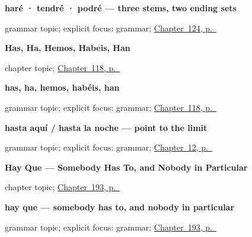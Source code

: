 \noindent\begin{minipage}[t]{\linewidth}
\raggedright
\textbf{haré · tendré · podré — three stems, two ending sets}\par
\footnotesize grammar topic; explicit focus: grammar; \hyperref[ch:spanish-future-conditional-stems]{Chapter~124, p.~\pageref*{ch:spanish-future-conditional-stems}}
\end{minipage}\par\smallskip

\noindent\begin{minipage}[t]{\linewidth}
\raggedright
\textbf{Has, Ha, Hemos, Habeis, Han}\par
\footnotesize chapter topic; \hyperref[ch:perfect-complete]{Chapter~118, p.~\pageref*{ch:perfect-complete}}
\end{minipage}\par\smallskip

\noindent\begin{minipage}[t]{\linewidth}
\raggedright
\textbf{has, ha, hemos, habéis, han}\par
\footnotesize grammar topic; explicit focus: grammar; \hyperref[ch:perfect-complete]{Chapter~118, p.~\pageref*{ch:perfect-complete}}
\end{minipage}\par\smallskip

\noindent\begin{minipage}[t]{\linewidth}
\raggedright
\textbf{hasta aquí / hasta la noche — point to the limit}\par
\footnotesize grammar topic; explicit focus: grammar; \hyperref[ch:goodbye]{Chapter~12, p.~\pageref*{ch:goodbye}}
\end{minipage}\par\smallskip

\noindent\begin{minipage}[t]{\linewidth}
\raggedright
\textbf{Hay Que --- Somebody Has To, and Nobody in Particular}\par
\footnotesize chapter topic; \hyperref[ch:hay-que]{Chapter~193, p.~\pageref*{ch:hay-que}}
\end{minipage}\par\smallskip

\noindent\begin{minipage}[t]{\linewidth}
\raggedright
\textbf{hay que — somebody has to, and nobody in particular}\par
\footnotesize grammar topic; explicit focus: grammar; \hyperref[ch:hay-que]{Chapter~193, p.~\pageref*{ch:hay-que}}
\end{minipage}\par\smallskip

